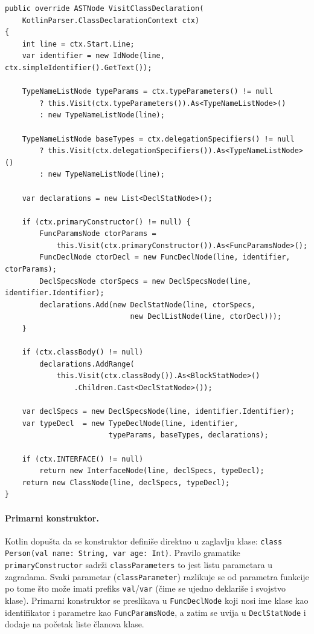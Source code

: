 \documentclass[a4paper]{article}
\begin{document}
\begin{lstlisting}[language=CSharp, caption={Posetilac za deklaraciju klase}]
public override ASTNode VisitClassDeclaration(
    KotlinParser.ClassDeclarationContext ctx)
{
    int line = ctx.Start.Line;
    var identifier = new IdNode(line, ctx.simpleIdentifier().GetText());

    TypeNameListNode typeParams = ctx.typeParameters() != null
        ? this.Visit(ctx.typeParameters()).As<TypeNameListNode>()
        : new TypeNameListNode(line);

    TypeNameListNode baseTypes = ctx.delegationSpecifiers() != null
        ? this.Visit(ctx.delegationSpecifiers()).As<TypeNameListNode>()
        : new TypeNameListNode(line);

    var declarations = new List<DeclStatNode>();

    if (ctx.primaryConstructor() != null) {
        FuncParamsNode ctorParams =
            this.Visit(ctx.primaryConstructor()).As<FuncParamsNode>();
        FuncDeclNode ctorDecl = new FuncDeclNode(line, identifier, ctorParams);
        DeclSpecsNode ctorSpecs = new DeclSpecsNode(line, identifier.Identifier);
        declarations.Add(new DeclStatNode(line, ctorSpecs,
                             new DeclListNode(line, ctorDecl)));
    }

    if (ctx.classBody() != null)
        declarations.AddRange(
            this.Visit(ctx.classBody()).As<BlockStatNode>()
                .Children.Cast<DeclStatNode>());

    var declSpecs = new DeclSpecsNode(line, identifier.Identifier);
    var typeDecl  = new TypeDeclNode(line, identifier,
                        typeParams, baseTypes, declarations);

    if (ctx.INTERFACE() != null)
        return new InterfaceNode(line, declSpecs, typeDecl);
    return new ClassNode(line, declSpecs, typeDecl);
}
\end{lstlisting}

\newpage
\paragraph{Primarni konstruktor.}
Kotlin dopušta da se konstruktor definiše direktno u zaglavlju klase:
\newline
\texttt{class Person(val name: String, var age: Int)}. 
\newline
Pravilo gramatike \texttt{primaryConstructor} sadrži \texttt{classParameters} to jest listu parametara
u zagradama. Svaki parametar (\texttt{classParameter}) razlikuje se od parametra
funkcije po tome što može imati prefiks \texttt{val}/\texttt{var} (čime se ujedno
deklariše i svojstvo klase). Primarni konstruktor se preslikava u \texttt{FuncDeclNode}
koji nosi ime klase kao identifikator i parametre kao \texttt{FuncParamsNode}, a
zatim se uvija u \texttt{DeclStatNode} i dodaje na početak liste članova klase.
\end{document}

